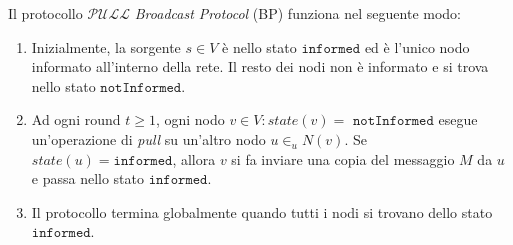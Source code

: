 Il protocollo $\mathcal{PULL}$ \textit{Broadcast Protocol} (BP) funziona nel seguente modo:

\begin{enumerate}
    \item Inizialmente, la sorgente $s \in V$ è nello stato $\texttt{informed}$ ed è l'unico nodo informato all'interno della rete. Il resto dei nodi non è informato e si trova nello stato $\texttt{notInformed}$.
    \item Ad ogni round $t \geq 1$, ogni nodo $v \in V: state(v) = \texttt{ notInformed}$ esegue un'operazione di \textit{pull} su un'altro nodo $u \in_{u} N(v)$. Se $state(u) = \texttt{informed}$, allora $v$ si fa inviare una copia del messaggio $M$ da $u$ e passa nello stato $\texttt{informed}$.
    \item Il protocollo termina globalmente quando tutti i nodi si trovano dello stato $\texttt{informed}$. 
\end{enumerate}

